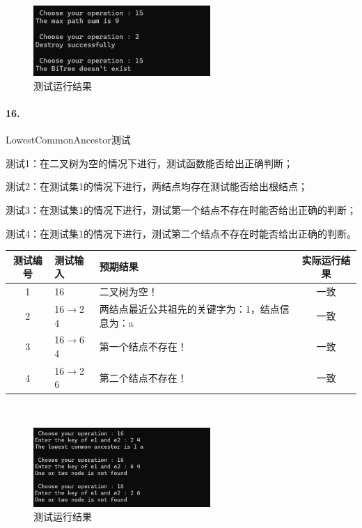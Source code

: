 \documentclass[supercite]{Experimental_Report}
\theoremstyle{definition}
\begin{document}
~\

\begin{figure}[H]
 	\centering
 	\includegraphics[width=0.6\textwidth]{images/二叉树测试15.png}
 	\caption{测试运行结果}
 	\label{txlab}
 \end{figure}

\paragraph{16.}LowestCommonAncestor测试
	
测试1：在二叉树为空的情况下进行，测试函数能否给出正确判断；

测试2：在测试集1的情况下进行，两结点均存在测试能否给出根结点；

测试3：在测试集1的情况下进行，测试第一个结点不存在时能否给出正确的判断；

测试4：在测试集1的情况下进行，测试第二个结点不存在时能否给出正确的判断。

\vspace{0.5em}

\begin{tabular}{|c|p{2.7cm}|p{6cm}|c|}
	\hline
	测试编号 & 测试输入 & 预期结果 & 实际运行结果 \\
	\hline
	1 & 16 & 二叉树为空！ & 一致 \\
	\hline
	2 & 16$\rightarrow$2 4 & 两结点最近公共祖先的关键字为：1，结点信息为：a & 一致 \\
	\hline
	3 & 16$\rightarrow$6 4 & 第一个结点不存在！& 一致 \\
	\hline
	4 & 16$\rightarrow$2 6 & 第二个结点不存在！ & 一致 \\
	\hline
\end{tabular}

~\

\begin{figure}[H]
 	\centering
 	\includegraphics[width=0.6\textwidth]{images/二叉树测试16.png}
 	\caption{测试运行结果}
 	\label{txlab}
 \end{figure}
\end{document}
